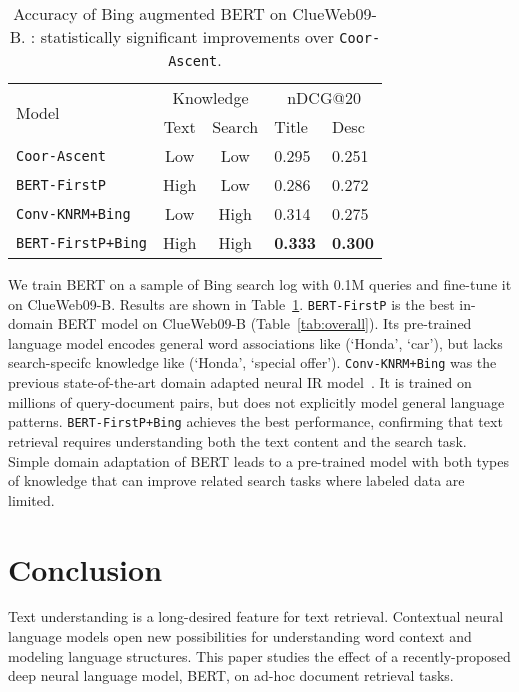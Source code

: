 \documentclass[sigconf]{acmart}
\begin{document}
\begin{table}[tb]
\caption{Accuracy of Bing augmented BERT on ClueWeb09-B. : statistically significant improvements over \texttt{Coor-Ascent}.}\label{tab:enhance}
\def\arraystretch{0.85}
\vspace{-0.15in}

\begin{tabular}{l|cc|ll}
\hline \hline
    \multirow{2}{*}{Model}  & \multicolumn{2}{c|}{Knowledge} & \multicolumn{2}{c}{nDCG@20} \\
              & Text &  Search         & {Title} & {Desc}\\ \hline
\texttt{Coor-Ascent}              & Low & Low   & 0.295     & 0.251    \\ \hline
\texttt{BERT-FirstP}  & High & Low & 0.286     & 0.272    \\ 

\texttt{Conv-KNRM+Bing}    &  Low & High   & 0.314      &  0.275     \\ 
\texttt{BERT-FirstP+Bing}  & High  & High  & \textbf{0.333}      & \textbf{0.300}   \\ 
 \hline \hline

\end{tabular}
\end{table}



We train BERT on a sample of Bing search log with 0.1M queries and fine-tune it on ClueWeb09-B. Results are shown in Table~\ref{tab:enhance}. \texttt{BERT-FirstP} is the best in-domain BERT model on ClueWeb09-B (Table~\ref{tab:overall}). Its pre-trained language model encodes general word associations like (`Honda', `car'), but lacks search-specifc knowledge like  (`Honda', `special offer').
\texttt{Conv-KNRM+Bing} was the previous state-of-the-art domain adapted neural IR model~\cite{dai2018convolutional}.  It is trained on millions of query-document pairs, but does not explicitly model general language patterns. \texttt{BERT-FirstP+Bing}  achieves the best performance, confirming that text retrieval requires understanding both the text content and the search task. Simple domain adaptation of BERT leads to a pre-trained model with both types of knowledge that can improve related search tasks where labeled data are limited. %
 
 \section{Conclusion}
Text understanding is a long-desired feature for text retrieval.  Contextual neural language models open new possibilities for understanding word context and modeling language structures. This paper studies the effect of a recently-proposed deep neural language model, BERT, on ad-hoc document retrieval tasks.
\end{document}
